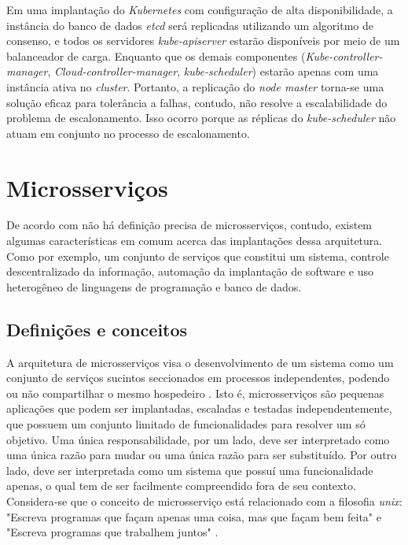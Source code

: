 Em uma implantação do \textit{Kubernetes} com configuração de alta disponibilidade, a instância do banco de dados \textit{etcd} será replicadas utilizando um algoritmo de consenso, e todos os servidores \textit{kube-apiserver} estarão disponíveis por meio de um balanceador de carga. Enquanto que os demais componentes (\textit{Kube-controller-manager}, \textit{Cloud-controller-manager}, \textit{kube-scheduler}) estarão apenas com uma instância ativa no \textit{cluster}. Portanto, a replicação do \textit{node master} torna-se uma solução eficaz para tolerância a falhas, contudo, não resolve a escalabilidade do problema de escalonamento. Isso ocorro porque as réplicas do \textit{kube-scheduler} não atuam em conjunto no processo de escalonamento.

\section{Microsserviços}

De acordo com  não há definição precisa de microsserviços, contudo, existem algumas características em comum acerca das implantações dessa arquitetura. Como por exemplo, um conjunto de serviços que constitui um sistema, controle descentralizado da informação, automação da implantação de software e uso heterogêneo de linguagens de programação e banco de dados.

\subsection{Definições e conceitos}
A arquitetura de microsserviços visa o desenvolvimento de um sistema como um conjunto de serviços sucintos seccionados em processos independentes, podendo ou não compartilhar o mesmo hospedeiro \cite{lewis2012microservices}. Isto é, microsserviços são pequenas aplicações que podem ser implantadas, escaladas e testadas independentemente, que possuem um conjunto limitado de funcionalidades para resolver um só objetivo. Uma única responsabilidade, por um lado, deve ser interpretado como uma única razão para mudar ou uma única razão para ser substituído. Por outro lado, deve ser interpretada como um sistema que possuí uma funcionalidade apenas, o qual tem de ser facilmente  compreendido fora de seu contexto. Considera-se que o conceito de microsserviço está relacionado com a filosofia \textit{unix}: "Escreva programas que façam apenas uma coisa, mas que façam bem feita" e "Escreva programas que trabalhem juntos" \cite{thones2015microservices}.

